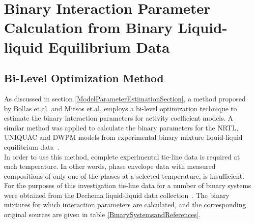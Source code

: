 \section{Binary Interaction Parameter Calculation from Binary Liquid-liquid Equilibrium Data}
\subsection{Bi-Level Optimization Method}
								
As discussed in section \ref{ModelParameterEstimationSection}, a method proposed by Bollas et.al. and Mitsos et.al. employs a bi-level optimization technique to estimate the binary interaction parameters for activity coefficient models. A similar method was applied to calculate the binary parameters for the NRTL, UNIQUAC and DWPM models from experimental binary mixture liquid-liquid equilibrium data~\cite{BilevelOptimization, BilevelOptimization2}.\\

In order to use this method, complete experimental tie-line data is required at each temperature. In other words, phase envelope data with measured compositions of only one of the phases at a selected temperature, is insufficient. For the purposes of this investigation tie-line data for a number of binary systems were obtained from the Dechema liquid-liquid data collection~\cite{Dechema}. The binary mixtures for which interaction parameters are calculated, and the corresponding original sources are given in table \ref{BinarySystemsandReferences}.\\

